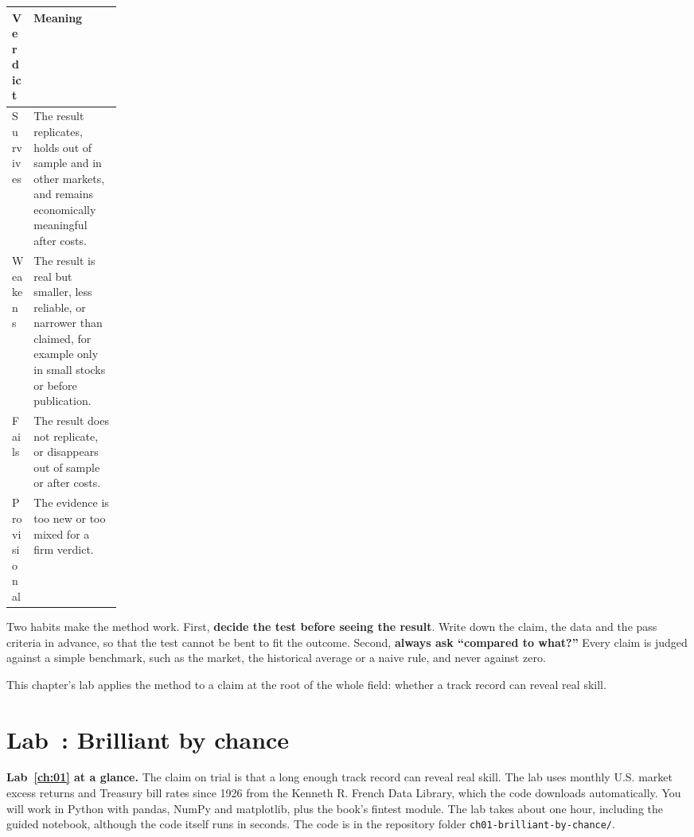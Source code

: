 \begin{center}
\small
\begin{tabularx}{0.9\linewidth}{@{}>{\raggedright\arraybackslash}p{0.162\linewidth}>{\raggedright\arraybackslash}X@{}}
\toprule
Verdict & Meaning \\
\midrule
Survives & The result replicates, holds out of sample and in other markets, and remains economically meaningful after costs. \\
Weakens & The result is real but smaller, less reliable, or narrower than claimed, for example only in small stocks or before publication. \\
Fails & The result does not replicate, or disappears out of sample or after costs. \\
Provisional & The evidence is too new or too mixed for a firm verdict. \\
\bottomrule
\end{tabularx}
\end{center}

Two habits make the method work. First, \textbf{decide the test before seeing the result}. Write down the claim, the data and the pass criteria in advance, so that the test cannot be bent to fit the outcome. Second, \textbf{always ask ``compared to what?''} Every claim is judged against a simple benchmark, such as the market, the historical average or a naive rule, and never against zero.

This chapter's lab applies the method to a claim at the root of the whole field: whether a track record can reveal real skill.

\section{Lab~\thechapter: Brilliant by chance}
\label{sec:01-lab}

\begin{callout}
\textbf{Lab~\ref{ch:01} at a glance.} The claim on trial is that a long enough track record can reveal real skill. The lab uses monthly U.S. market excess returns and Treasury bill rates since 1926 from the Kenneth R. French Data Library, which the code downloads automatically. You will work in Python with pandas, NumPy and matplotlib, plus the book's fintest module. The lab takes about one hour, including the guided notebook, although the code itself runs in seconds. The code is in the repository folder \texttt{ch01-brilliant-by-chance/}.
\end{callout}

